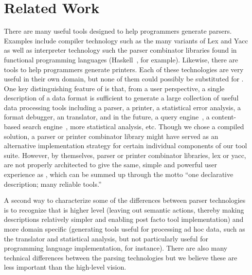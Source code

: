 \section{Related Work}
\label{sec:related}

There are many useful tools designed to help programmers generate
parsers.  Examples include compiler technology such as the many
variants of Lex and Yacc as well as interpreter technology such the
parser combinator libraries
found in functional programming languages 
(Haskell~\cite{hutton+:parser-combinators}, for example).
Likewise, there are tools to help programmers generate printers.  Each of
these technologies are very useful in their own domain, but none of
them could possibly be substituted for \padsml{}.  One key
distinguishing feature of \padsml{} is that, from a user perspective,
a single description of a data format is sufficient to generate a
large collection of useful data processing tools including a parser, a
printer, a statistical error analysis, a format debugger, an \xml{}
translator, and in the future, a query engine~\cite{fernandez+:padx},
a content-based search engine~\cite{lv+:cbs,oh:siw}, more statistical analysis, etc.
Though we chose a compiled solution, a parser or printer combinator
library might have served as an alternative implementation strategy
for certain individual components of our tool suite.  However, by
themselves, parser or printer combinator libraries, lex or yacc, are
not properly architected to give the same, simple and powerful user
experience as \padsml{}, which can be summed up through the motto
``one declarative description; many reliable tools.''  

A second way to characterize some of the differences between parser
technologies is to recognize that \padsml{} is higher level (leaving
out semantic actions, thereby making descriptions relatively simpler
and enabling post facto tool implementation) and more domain specific
(generating tools useful for processing ad hoc data, such as the
\xml{} translator and statistical analysis, but not particularly
useful for programming language implementation, for instance).  There
are also many technical differences between the parsing technologies
but we believe these are less important than the high-level vision.

